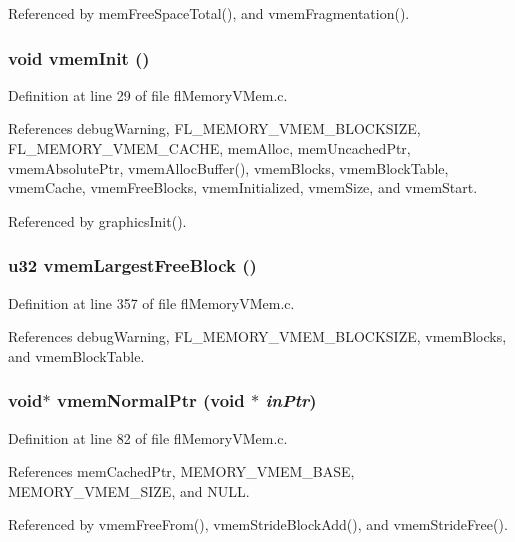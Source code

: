 Referenced by mem\-Free\-Space\-Total(), and vmem\-Fragmentation().
\subsubsection{\setlength{\rightskip}{0pt plus 5cm}void vmem\-Init ()}\label{flMemoryVMem_8h_2089203f3b650112b2532238ef57d6d0}




Definition at line 29 of file fl\-Memory\-VMem.c.

References debug\-Warning, FL\_\-MEMORY\_\-VMEM\_\-BLOCKSIZE, FL\_\-MEMORY\_\-VMEM\_\-CACHE, mem\-Alloc, mem\-Uncached\-Ptr, vmem\-Absolute\-Ptr, vmem\-Alloc\-Buffer(), vmem\-Blocks, vmem\-Block\-Table, vmem\-Cache, vmem\-Free\-Blocks, vmem\-Initialized, vmem\-Size, and vmem\-Start.

Referenced by graphics\-Init().
\subsubsection{\setlength{\rightskip}{0pt plus 5cm}u32 vmem\-Largest\-Free\-Block ()}\label{flMemoryVMem_8h_9c58c42e2ef77c55eca5f31df1ffd5c4}




Definition at line 357 of file fl\-Memory\-VMem.c.

References debug\-Warning, FL\_\-MEMORY\_\-VMEM\_\-BLOCKSIZE, vmem\-Blocks, and vmem\-Block\-Table.
\subsubsection{\setlength{\rightskip}{0pt plus 5cm}void$\ast$ vmem\-Normal\-Ptr (void $\ast$ {\em in\-Ptr})}\label{flMemoryVMem_8h_e876e1020d33a6504c9f4a14ff9dcb49}




Definition at line 82 of file fl\-Memory\-VMem.c.

References mem\-Cached\-Ptr, MEMORY\_\-VMEM\_\-BASE, MEMORY\_\-VMEM\_\-SIZE, and NULL.

Referenced by vmem\-Free\-From(), vmem\-Stride\-Block\-Add(), and vmem\-Stride\-Free().
